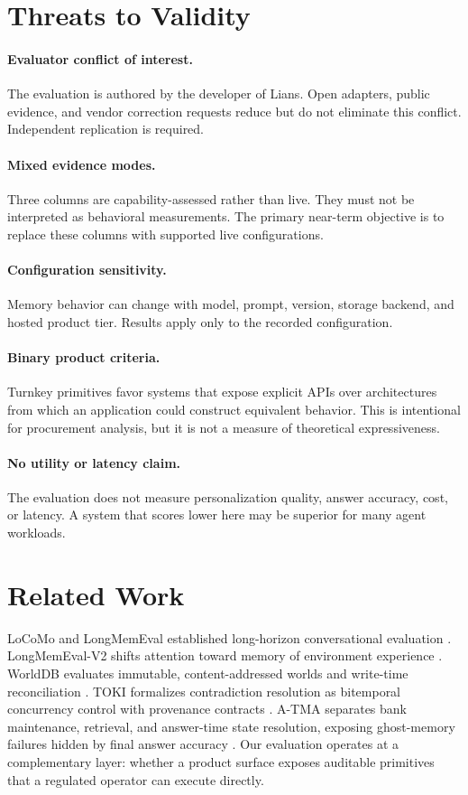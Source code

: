 \documentclass[11pt]{article}
\begin{document}
\section{Threats to Validity}
\paragraph{Evaluator conflict of interest.} The evaluation is authored by the developer of Lians. Open adapters, public evidence, and vendor correction requests reduce but do not eliminate this conflict. Independent replication is required.

\paragraph{Mixed evidence modes.} Three columns are capability-assessed rather than live. They must not be interpreted as behavioral measurements. The primary near-term objective is to replace these columns with supported live configurations.

\paragraph{Configuration sensitivity.} Memory behavior can change with model, prompt, version, storage backend, and hosted product tier. Results apply only to the recorded configuration.

\paragraph{Binary product criteria.} Turnkey primitives favor systems that expose explicit APIs over architectures from which an application could construct equivalent behavior. This is intentional for procurement analysis, but it is not a measure of theoretical expressiveness.

\paragraph{No utility or latency claim.} The evaluation does not measure personalization quality, answer accuracy, cost, or latency. A system that scores lower here may be superior for many agent workloads.

\section{Related Work}
LoCoMo and LongMemEval established long-horizon conversational evaluation \cite{locomo,longmemeval}. LongMemEval-V2 shifts attention toward memory of environment experience \cite{longmemevalv2}. WorldDB evaluates immutable, content-addressed worlds and write-time reconciliation \cite{worlddb}. TOKI formalizes contradiction resolution as bitemporal concurrency control with provenance contracts \cite{toki}. A-TMA separates bank maintenance, retrieval, and answer-time state resolution, exposing ghost-memory failures hidden by final answer accuracy \cite{atma}. Our evaluation operates at a complementary layer: whether a product surface exposes auditable primitives that a regulated operator can execute directly.
\end{document}
